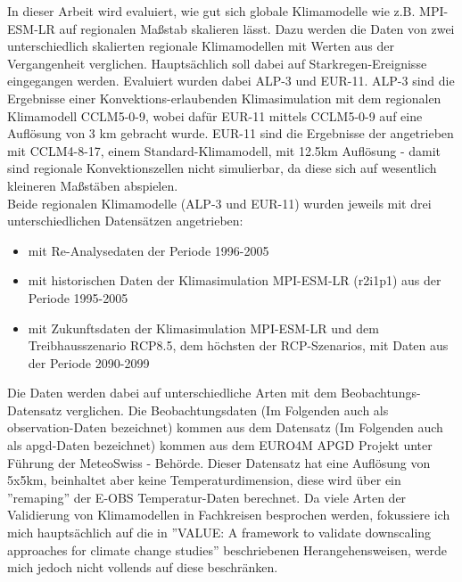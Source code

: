 In dieser Arbeit wird evaluiert, wie gut sich globale Klimamodelle wie z.B. MPI-ESM-LR auf regionalen Maßstab skalieren lässt. Dazu werden die Daten von zwei unterschiedlich skalierten regionale Klimamodellen mit Werten aus der Vergangenheit verglichen. Hauptsächlich soll dabei auf Starkregen-Ereignisse eingegangen werden. Evaluiert wurden dabei ALP-3 und EUR-11. ALP-3 sind  die Ergebnisse einer Konvektions-erlaubenden Klimasimulation mit dem regionalen Klimamodell CCLM5-0-9, wobei dafür EUR-11 mittels CCLM5-0-9 auf eine Auflösung von 3 km gebracht wurde. EUR-11 sind die Ergebnisse der angetrieben mit CCLM4-8-17, einem Standard-Klimamodell, mit 12.5km Auflösung - damit sind regionale Konvektionszellen nicht simulierbar, da diese sich auf wesentlich kleineren Maßstäben abspielen.\\
Beide regionalen Klimamodelle (ALP-3 und EUR-11) wurden jeweils mit drei unterschiedlichen Datensätzen angetrieben: 
\begin{itemize}
	\item mit Re-Analysedaten der Periode 1996-2005
	\item mit historischen Daten der Klimasimulation MPI-ESM-LR (r2i1p1) aus der Periode 1995-2005
	\item mit Zukunftsdaten der Klimasimulation MPI-ESM-LR und dem Treibhausszenario RCP8.5, dem höchsten der RCP-Szenarios, mit Daten aus der Periode 2090-2099
\end{itemize}
Die Daten werden dabei auf unterschiedliche Arten mit dem Beobachtungs-Datensatz verglichen. Die Beobachtungsdaten (Im Folgenden auch als observation-Daten bezeichnet) kommen aus dem Datensatz (Im Folgenden auch als apgd-Daten bezeichnet) kommen aus dem EURO4M APGD Projekt unter Führung der MeteoSwiss - Behörde\cite{meteoswiss}. Dieser Datensatz hat eine Auflösung von 5x5km, beinhaltet aber keine Temperaturdimension, diese wird über ein ''remaping'' der E-OBS Temperatur-Daten berechnet.
Da viele Arten der Validierung von Klimamodellen in Fachkreisen besprochen werden, fokussiere ich mich hauptsächlich auf die in ''VALUE: A framework to validate downscaling approaches for climate change studies'' \cite{maraun_value} beschriebenen Herangehensweisen, werde mich jedoch nicht vollends auf diese beschränken.